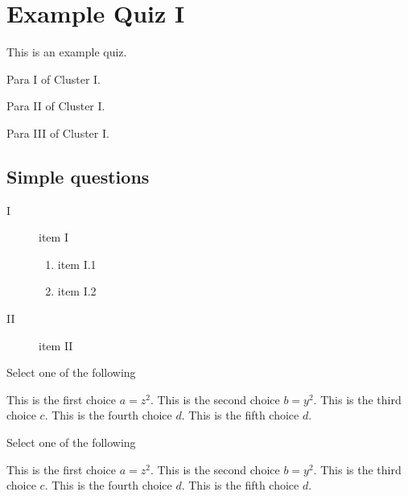 \chapter{Example Quiz I}
\label{ch:quiz-i}

\begin{preamble}
This is an example quiz.
\end{preamble}

\begin{cluster}[Cluster I]
\begin{gram}
Para I of Cluster I.
\end{gram}

\begin{flex}
\begin{gram}
Para II of Cluster I.
\end{gram}

\begin{gram}
Para III of Cluster I.
\end{gram}
\end{flex}
\end{cluster}

\section{Simple questions}
\label{XXsec:sets::math}

\begin{gram}
\begin{description}
\item[I] item I
\begin{enumerate}
\item item I.1
\item item I.2
\end{enumerate}

\item[II] item II
\end{description}
\end{gram}


\begin{problem}[Pickone I]
Select one of the following
\begin{pickone}
\choice This is the first choice $a = z^2$.
\choice This is the second choice $b = y^2$.
\correctchoice This is the third choice $c$.
\correctchoice This is the fourth choice $d$.
\choice This is the fifth choice $d$.
\end{pickone}
\end{problem}

\begin{problem}[Pickone I.2]
Select one of the following
\begin{pickany}
\choice This is the first choice $a = z^2$.
\choice This is the second choice $b = y^2$.
\correctchoice This is the third choice $c$.
\correctchoice This is the fourth choice $d$.
\choice This is the fifth choice $d$.
\end{pickany}
\end{problem}


